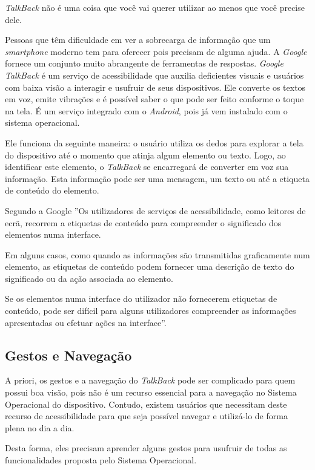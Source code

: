 \textit{TalkBack} não é uma coisa que você vai querer utilizar ao menos que você precise dele.

Pessoas que têm dificuldade em ver a sobrecarga de informação que um \textit{smartphone} moderno tem para oferecer pois precisam de alguma ajuda. A \textit{Google} fornece um conjunto muito abrangente de ferramentas de respostas. \textit{Google TalkBack} é um serviço de acessibilidade que auxilia deficientes visuais e usuários com baixa visão a interagir e usufruir de seus dispositivos.
Ele converte os textos em voz, emite vibrações e é possível saber o que pode ser feito conforme o toque na tela. É um serviço integrado com o \textit{Android}, pois já vem instalado com o sistema operacional. \cite{talkback}

Ele funciona da seguinte maneira: o usuário utiliza os dedos para explorar a tela do dispositivo até o momento que atinja algum elemento ou texto. Logo, ao identificar este elemento, o \textit{TalkBack} se encarregará de converter em voz sua informação. Esta informação pode ser uma mensagem, um texto ou até a etiqueta de conteúdo do elemento.

Segundo a Google \cite{etiquetas} ''Os utilizadores de serviços de acessibilidade, como leitores de ecrã, recorrem a etiquetas de conteúdo para compreender o significado dos elementos numa interface.

Em alguns casos, como quando as informações são transmitidas graficamente num elemento, as etiquetas de conteúdo podem fornecer uma descrição de texto do significado ou da ação associada ao elemento.

Se os elementos numa interface do utilizador não fornecerem etiquetas de conteúdo, pode ser difícil para alguns utilizadores compreender as informações apresentadas ou efetuar ações na interface''.

\subsection{Gestos e Navegação}
A priori, os gestos e a navegação do \textit{TalkBack} pode ser complicado para quem possui boa visão, pois não é um recurso essencial para a navegação no Sistema Operacional do dispositivo. Contudo, existem usuários que necessitam deste recurso de acessibilidade para que seja possível navegar e utilizá-lo de forma plena no dia a dia.

Desta forma, eles precisam aprender alguns gestos para usufruir de todas as funcionalidades proposta pelo Sistema Operacional.

